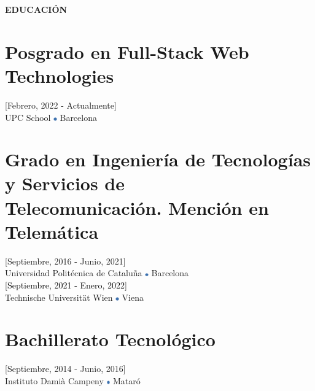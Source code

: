 \documentclass[../main.tex]{subfiles}
\begin{document}
    \vspace*{-0.4cm}
    \textbf{\textcolor{myCV2}{EDUCACIÓN\underline{\hspace{7.5cm}}}}
        \vspace*{-0.3cm}
        
        \section*{Posgrado en Full-Stack Web Technologies}
        \vspace*{-0.4cm}
        [Febrero, 2022 - Actualmente] \\
        UPC School
        \includegraphics[width=0.15cm]{assets/blue.png} 
        Barcelona
        
        \vspace*{-0.25cm}
        \section*{Grado en Ingeniería de Tecnologías y Servicios de \\Telecomunicación. Mención en Telemática}
        \vspace*{-0.4cm}
        [Septiembre, 2016 - Junio, 2021] \\
        Universidad Politécnica de Cataluña 
        \includegraphics[width=0.15cm]{assets/blue.png} 
        Barcelona \\
        \textcolor{black}{[Septiembre, 2021 - Enero, 2022]}\\
        Technische Universität Wien
        \includegraphics[width=0.15cm]{assets/blue.png} 
        Viena
        
        \vspace*{-0.25cm}
        \section*{Bachillerato Tecnológico}
        \vspace*{-0.4cm}
        [Septiembre, 2014 - Junio, 2016] \\
        Instituto Damià Campeny
        \includegraphics[width=0.15cm]{assets/blue.png} 
        Mataró

\end{document}
